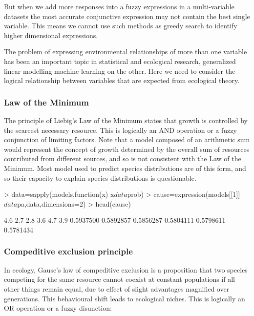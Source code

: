 \documentclass{article}
\begin{document}
But when we add more responses into a fuzzy expressions in a multi-variable datasets the most accurate conjunctive expression may not contain the best single variable.  This means we cannot use such methods as greedy search to identify higher dimensional expressions.  

The problem of expressing environmental relationships of more than one variable has been an important topic in statistical and ecological research, generalized linear modelling {} machine learning {} on the other.  Here we need to consider the logical relationship between variables that are expected from ecological theory.


\subsubsection{Law of the Minimum}

The principle of Liebig's Law of the Minimum states that growth is controlled by the scarcest necessary resource.  This is logically an AND operation or a fuzzy conjunction of limiting factors.  Note that a model composed of an arithmetic sum would represent the concept of growth determined by the overall sum of resources contributed from different sources, and so is not consistent with the Law of the Minimum.  Most model used to predict species distributions are of this form, and so their capacity to explain species distributions is questionable. 

\begin{Schunk}
\begin{Sinput}
> data=sapply(models,function(x) x$data$prob)
> cause=expression(models[[1]]$data$pa,data,dimensions=2)
> head(cause)
\end{Sinput}
\begin{Soutput}
      4.6       2.7       2.8       3.6       4.7       3.9 
0.5937500 0.5892857 0.5856287 0.5804111 0.5798611 0.5781434 
\end{Soutput}
\end{Schunk}


\subsubsection{Compeditive exclusion principle}

In ecology, Gause's law of compeditive exclusion is a proposition that two species competing for the same resource cannot coexist at constant populations if all other things remain equal, due to effect of slight advantages magnified over generations.  This behavioural shift leads to ecological niches.  This is logically an OR operation or a fuzzy disunction:
\end{document}
